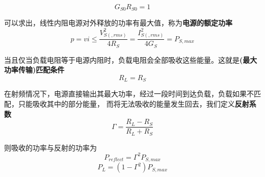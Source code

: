    \[
    G_{S0}R_{S0}=1    
    \]
    \par 可以求出，线性内阻电源对外释放的功率有最大值，称为\textbf{电源的额定功率}
    \[
    p=vi\leqslant\frac{V_{S(,rms)}^2}{4R_S}=\frac{I_{S(,rms)}^2}{4G_S}=P_{S,max}   
    \]
    \par 当且仅当负载电阻等于电源内阻时，负载电阻会全部吸收这些能量。这就是\textbf{(最大功率传输)匹配条件}
    \[
    R_L=R_S    
    \]
    \par 在射频情况下，电源直接输出其最大功率，经过一段时间到达负载，负载如果不匹配，只能吸收其中的部分能量，
    而将无法吸收的能量发生回去，我们定义\textbf{反射系数}
    \[
    \Gamma=\frac{R_L-R_S}{R_L+R_S}    
    \]
    \par 则吸收的功率与反射的功率为
    \[
    P_{reflect}=\Gamma^2 P_{S,max}   
    \]
    \[
    P_L=(1-\Gamma^2)P_{S,max}    
    \]
